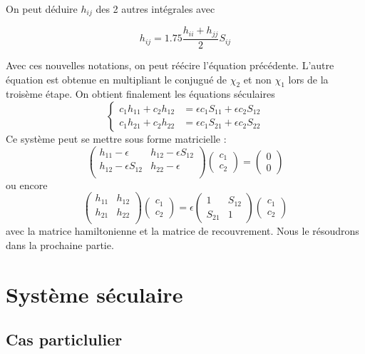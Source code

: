 \documentclass[french]{yLectureNote}
\begin{document}
On peut déduire \(h_{ij}\) des 2 autres intégrales avec
\begin{theorem}
 \[h_{ij} = 1.75\frac{h_{ii}+h_{jj}}{2}S_{ij}\]
\end{theorem}
Avec ces nouvelles notations, on peut réécire l'équation précédente. L'autre équation est obtenue en multipliant le conjugué de \(\chi_2\) et non \(\chi_1\) lors de la troisème étape. On obtient finalement les équations séculaires
\[\left\{\begin{matrix}
 c_1h_{11}+c_2h_{12} &= \epsilon c_1S_{11}+\epsilon c_2S_{12}\\
 c_1h_{21}+c_2h_{22} &= \epsilon c_1S_{21}+\epsilon c_2S_{22}
\end{matrix}\right.\]
Ce système peut se mettre sous forme matricielle :
\[\begin{pmatrix}
h_{11}-\epsilon & h_{12}-\epsilon S_{12}  \\
h_{12}-\epsilon S_{12} & h_{22}-\epsilon \\
\end{pmatrix}
\begin{pmatrix}
c_1 \\ c_2
\end{pmatrix} = \begin{pmatrix}
0 \\ 0
\end{pmatrix}\] ou encore
\[\begin{pmatrix}
h_{11} & h_{12}  \\
h_{21}& h_{22} \\
\end{pmatrix}
\begin{pmatrix}
c_1 \\ c_2
\end{pmatrix} = \epsilon \begin{pmatrix}
1&S_{12} \\ S_{21}&1
\end{pmatrix} \begin{pmatrix}
c_1 \\ c_2
\end{pmatrix}\] avec la matrice hamiltonienne et la matrice de recouvrement.
Nous le résoudrons dans la prochaine partie.
\section{Système séculaire}
\subsection{Cas particlulier}
%
%
\end{document}

